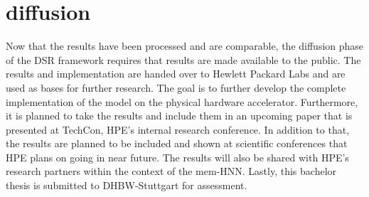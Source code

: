 \section{diffusion}
Now that the results have been processed and are comparable, the diffusion phase of the \ac{DSR} framework 
requires that results are made available to the public. 
The results and implementation are handed over to Hewlett Packard Labs and are used as 
bases for further research.
The goal is to further develop the complete implementation of the model on the physical hardware accelerator.
Furthermore, it is planned to take the results and include them in an upcoming paper that is presented
at TechCon, HPE's internal research conference. 
In addition to that, the results are planned to be included and shown at scientific conferences that HPE plans on going in near future.
The results will also be shared with HPE's research partners within the context of the \ac{mem-HNN}.
Lastly, this bachelor thesis is submitted to DHBW-Stuttgart for assessment. 
